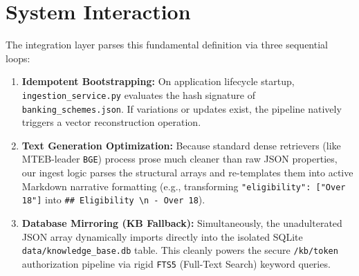 \documentclass[11pt,a4paper]{article}
\begin{document}
\section{System Interaction}
The integration layer parses this fundamental definition via three sequential loops:
\begin{enumerate}
    \item \textbf{Idempotent Bootstrapping:} On application lifecycle startup, \texttt{ingestion\_service.py} evaluates the hash signature of \texttt{banking\_schemes.json}. If variations or updates exist, the pipeline natively triggers a vector reconstruction operation.
    \item \textbf{Text Generation Optimization:} Because standard dense retrievers (like MTEB-leader \texttt{BGE}) process prose much cleaner than raw JSON properties, our ingest logic parses the structural arrays and re-templates them into active Markdown narrative formatting (e.g., transforming \texttt{"eligibility": ["Over 18"]} into \texttt{\#\# Eligibility \textbackslash n - Over 18}).
    \item \textbf{Database Mirroring (KB Fallback):} Simultaneously, the unadulterated JSON array dynamically imports directly into the isolated SQLite \texttt{data/knowledge\_base.db} table. This cleanly powers the secure \texttt{/kb/token} authorization pipeline via rigid \texttt{FTS5} (Full-Text Search) keyword queries.
\end{enumerate}
\end{document}
